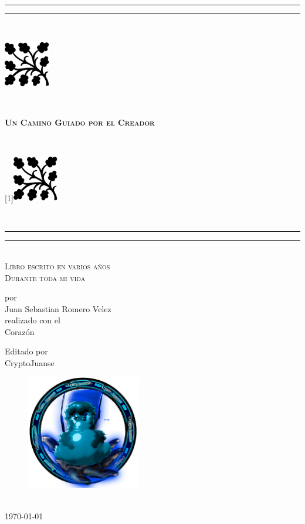 {\begingroup
\centering %
\vfill
\parbox{\textwidth}{%
\rule{\textwidth}{1.6pt}\vspace*{-\baselineskip}\vspace*{2pt} %
\rule{\textwidth}{0.4pt}\\[0.2\baselineskip] %
\parbox{\textwidth}{%
\parbox[c][2cm][c]{2cm}{\includegraphics[height=2cm]{tikz/19}}
~ \hrulefill ~
\parbox[c][2cm][c]{5cm}{\centering\textsc{\LARGE \textbf{Un Camino Guiado por el Creador}}}
 ~\hrulefill ~
\parbox[c][2cm][c]{2cm}{\scalebox{-1}[1]{\includegraphics[height=2cm]{tikz/19}}}}\\[0.2\baselineskip] %
\rule{\textwidth}{0.4pt}\vspace*{-\baselineskip}\vspace{3.2pt} %
\rule{\textwidth}{1.6pt}}\\[\baselineskip] %
\scshape %
Libro escrito en varios años \\[0.2\baselineskip] %
Durante toda mi vida\par %
\vspace*{2\baselineskip} %
por \\[0.5\baselineskip]
{\Large Juan Sebastian Romero Velez} \\
\vfill
{realizado con el \\ {Corazón}} 
\vfill 
\vfill
{Editado por \\ {CryptoJuanse}\par} %
\begin{figure}[ht]
    \centering
    \includegraphics[width=5cm]{img/logo.png}
\end{figure}
\vfill %
\href{https://github.com/CryptoJuanse}{} \\[0.3\baselineskip] %
{\scshape \today} \\[0.3\baselineskip] %

}
